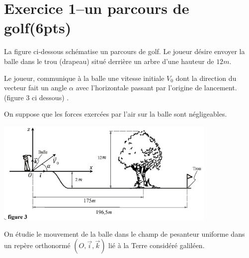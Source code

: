 \documentclass[12pt]{article}
\begin{document}
\section*{Exercice 1–un parcours de golf\dotfill(6pts)}




La figure ci-dessous schématise un parcours de golf. Le joueur désire envoyer la balle dans le trou
(drapeau) situé derrière un arbre d’une hauteur de $12 m$.

Le joueur, communique à la balle une vitesse initiale $V_0$ dont la direction du vecteur fait un angle $\alpha$
avec l’horizontale passant par l’origine de lancement. (figure 3 ci dessous) .

On suppose que les forces exercées par l'air sur la balle sont négligeables.



 \begin{center}
	\includegraphics[width=0.8\textwidth]{./img/chute00.png}
  \end{center}


On étudie le mouvement de la balle dans le champ de pesanteur uniforme dans un repère orthonormé
$(O,\vec{i} , \vec{k})$ lié à la Terre considéré galiléen.
\end{document}
